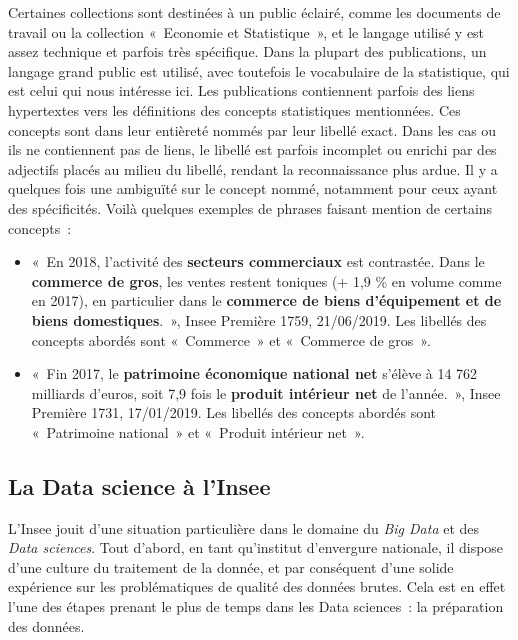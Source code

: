 Certaines collections sont destinées à un public éclairé, comme les documents de travail ou la collection «~Economie et Statistique~», et le langage utilisé y est assez technique et parfois très spécifique. Dans la plupart des publications, un langage grand public est utilisé, avec toutefois le vocabulaire de la statistique, qui est celui qui nous intéresse ici. Les publications contiennent parfois des liens hypertextes vers les définitions des concepts statistiques mentionnées. Ces concepts sont dans leur entièreté nommés par leur libellé exact. Dans les cas ou ils ne contiennent pas de liens, le libellé est parfois incomplet ou enrichi par des adjectifs placés au milieu du libellé, rendant la reconnaissance plus ardue. Il y a quelques fois une ambiguïté sur le concept nommé, notamment pour ceux ayant des spécificités. Voilà quelques exemples de phrases faisant mention de certains concepts~:
\begin{itemize}
    \vspace{5pt}
    \item «~En 2018, l'activité des \textbf{secteurs commerciaux} est contrastée. Dans le \textbf{commerce de gros}, les ventes restent toniques (+ 1,9 \% en volume comme en 2017), en particulier dans le \textbf{commerce de biens d'équipement et de biens domestiques}.~», Insee Première 1759, 21/06/2019.
    Les libellés des concepts abordés sont «~Commerce~» et «~Commerce de gros~».
    \vspace{5pt}
    \item «~Fin 2017, le \textbf{patrimoine économique national net} s’élève à 14 762 milliards d’euros, soit 7,9 fois le \textbf{produit intérieur net} de l’année.~», Insee Première 1731, 17/01/2019.
    Les libellés des concepts abordés sont «~Patrimoine national~» et «~Produit intérieur net~».
\end{itemize}
\label{section 1.2.2}

\subsection{La Data science à l'Insee}

L'Insee jouit d'une situation particulière dans le domaine du \textit{Big Data} et des \textit{Data sciences}. Tout d'abord, en tant qu'institut d'envergure nationale, il dispose d'une culture du traitement de la donnée, et par conséquent d'une solide expérience sur les problématiques de qualité des données brutes. Cela est en effet l'une des étapes prenant le plus de temps dans les Data sciences~: la préparation des données.
\newline

